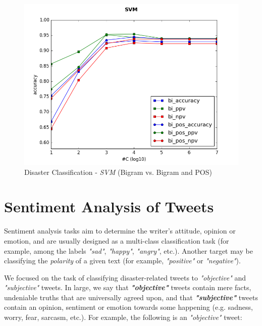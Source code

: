 \documentclass[letterpaper,twocolumn,10pt]{article}
\begin{document}
\begin{figure}[H]
	\centering
	\includegraphics[trim={0 0 0 1cm},clip,width=\columnwidth]{../graphs/DisasterClassification/svm_bi_features.png}
	\caption{Disaster Classification - \textit{SVM} (Bigram vs. Bigram and POS)}
	\label{fig:disaster_classification_svm_bi}
\end{figure}

\section{Sentiment Analysis of Tweets}  \label{mission2}

Sentiment analysis tasks aim to determine the writer's attitude, opinion or emotion, and are usually designed as a multi-class classification task (for example, among the labels \textit{"sad"}, \textit{"happy"}, \textit{"angry"}, etc.). Another target may be classifying the \textit{polarity} of a given text (for example, \textit{"positive"} or \textit{"negative"}).

We focused on the task of classifying disaster-related tweets to \textit{"objective"} and \textit{"subjective"} tweets. In large, we say that \textbf{\textit{"objective"}} tweets contain mere facts, undeniable truths that are universally agreed upon, and that \textbf{\textit{"subjective"}} tweets contain an opinion, sentiment or emotion towards some happening (e.g. sadness, worry, fear, sarcasm, etc.). For example, the following is an \textit{"objective"} tweet:

\begin{center}
	\parbox{190pt}{}
\end{center}
\end{document}
